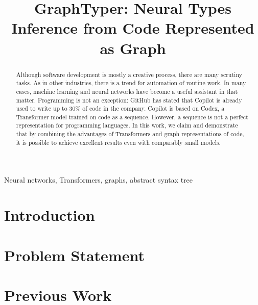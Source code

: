 \documentclass[conference]{IEEEtran}
\begin{document}
\author{
     \and
    \and
}

\title{GraphTyper: Neural Types Inference from Code Represented as Graph}

\begin{abstract}
    Although software development is mostly a creative process, there are many scrutiny tasks.
    As in other industries, there is a trend for automation of routine work.
    In many cases, machine learning and neural networks have become a useful assistant in that matter.
    Programming is not an exception:
    GitHub has stated that Copilot is already used to write up to 30\% of code in the company.
    Copilot is based on Codex, a Transformer model trained on code as a sequence.
    However, a sequence is not a perfect representation for programming languages.
    In this work, we claim and demonstrate that by combining the advantages of Transformers
    and graph representations of code, it is possible to achieve excellent results even with comparably small models.
\end{abstract}

\begin{IEEEkeywords}
    Neural networks, Transformers, graphs, abstract syntax tree
\end{IEEEkeywords}

\maketitle

\section{Introduction}\label{sec:introduction}


\section{Problem Statement}\label{sec:problem-statement}


\section{Previous Work}\label{sec:previous-work}

\end{document}
